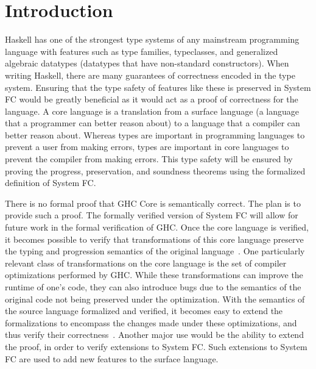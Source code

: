 \documentclass{sig-alternate}
\begin{document}
\section{Introduction}
\label{sec:intro}
Haskell has one of the strongest type systems of any mainstream programming language with features such as type families, typeclasses, and generalized algebraic datatypes (datatypes that have non-standard constructors). When writing Haskell, there are many guarantees of correctness encoded in the type system. Ensuring that the type safety of features like these is preserved in System FC would be greatly beneficial as it would act as a proof of correctness for the language. A core language is a translation from a surface language (a language that a programmer can better reason about) to a language that a compiler can better reason about. Whereas types are important in programming languages to prevent a user from making errors, types are important in core languages to prevent the compiler from making errors. This type safety will be ensured by proving the progress, preservation, and soundness theorems using the formalized definition of System FC.



There is no formal proof that GHC Core is semantically correct. The plan is to provide such a proof. The formally verified version of System FC will allow for future work in the formal verification of GHC. Once the core language is verified, it becomes possible to verify that transformations of this core language preserve the typing and progression semantics of the original language~\cite{zhao2013formalizing}. One particularly relevant class of transformations on the core language is the set of compiler optimizations performed by GHC. While these transformations can improve the runtime of one's code, they can also introduce bugs due to the semantics of the original code not being preserved under the optimization. With the semantics of the source language formalized and verified, it becomes easy to extend the formalizations to encompass the changes made under these optimizations, and thus verify their correctness~\cite{Zhao:2012:FLI:2103656.2103709}. Another major use would be the ability to extend the proof, in order to verify extensions to System FC. Such extensions to System FC are used to add new features to the surface language.
\end{document}
